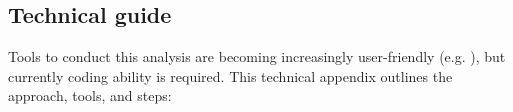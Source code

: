 \documentclass[onecolumn,doublespacing]{risa}
\let \citeA \textcite
\begin{document}
\backmatter



% 

\printbibliography

\appendix

\section{}
\subsection{Technical guide}%


Tools to conduct this analysis are becoming increasingly user-friendly (e.g. \citeA{noel2019-pypi}), but currently coding ability is required. This technical appendix outlines the approach, tools, and steps:
\end{document}
